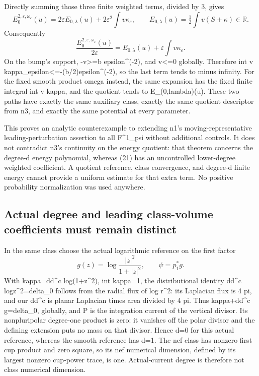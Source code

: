 \documentclass[
]{article}
\begin{document}
Directly summing those three finite weighted terms, divided by 3, gives
\[
E^{2,\varepsilon,\omega_\varepsilon}_0(u)
=2\varepsilon E_{0,\lambda}(u)+2\varepsilon^2\int v\kappa_\varepsilon,
\qquad E_{0,\lambda}(u)=\tfrac12\int v(S+\kappa)\in\mathbb R.
\] Consequently \[
\frac{E^{2,\varepsilon,\omega_\varepsilon}_0(u)}{2\varepsilon}
=E_{0,\lambda}(u)+\varepsilon\int v\kappa_\varepsilon.\tag{21}
\] On the bump's support, -v\textgreater=b epsilon\^{}(-2), and
v\textless=0 globally. Therefore int v
kappa\_epsilon\textless=-(b/2)epsilon\^{}(-2), so the last term tends to
minus infinity. For the fixed smooth product omega instead, the same
expansion has the fixed finite integral int v kappa, and the quotient
tends to E\_(0,lambda)(u). These two paths have exactly the same
auxiliary class, exactly the same quotient descriptor from n3, and
exactly the same potential at every parameter.

This proves an analytic counterexample to extending n1's
moving-representative leading-perturbation assertion to all F\^{}1\_psi
without additional controls. It does not contradict n3's continuity on
the energy quotient: that theorem concerns the degree-d energy
polynomial, whereas (21) has an uncontrolled lower-degree weighted
coefficient. A quotient reference, class convergence, and degree-d
finite energy cannot provide a uniform estimate for that extra term. No
positive probability normalization was used anywhere.

\subsection{Actual degree and leading class-volume coefficients must
remain
distinct}\label{actual-degree-and-leading-class-volume-coefficients-must-remain-distinct}

In the same class choose the actual logarithmic reference on the first
factor \[
g(z)=\log\frac{|z|^2}{1+|z|^2},\qquad\psi=p_1^*g.
\] With kappa=dd\^{}c log(1+\textbar z\textbar\^{}2), int kappa=1, the
distributional identity dd\^{}c log\textbar z\textbar\^{}2=delta\_0
follows from the radial flux of log r\^{}2: its Laplacian flux is 4 pi,
and our dd\^{}c is planar Laplacian times area divided by 4 pi. Thus
kappa+dd\^{}c g=delta\_0, globally, and P is the integration current of
the vertical divisor. Its nonpluripolar degree-one product is zero: it
vanishes off the polar divisor and the defining extension puts no mass
on that divisor. Hence d=0 for this actual reference, whereas the smooth
reference has d=1. The nef class has nonzero first cup product and zero
square, so its nef numerical dimension, defined by its largest nonzero
cup-power trace, is one. Actual-current degree is therefore not class
numerical dimension.
\end{document}
